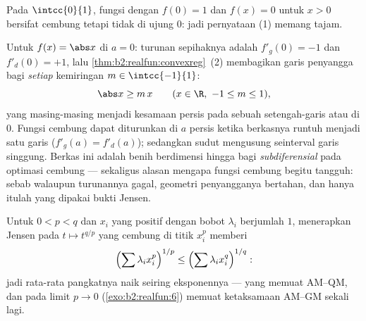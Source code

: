 \begin{example}
Pada $\intcc{0}{1}$, fungsi dengan $f(0) = 1$ dan $f(x) = 0$ untuk $x >
0$ bersifat cembung tetapi tidak  di ujung $0$: jadi pernyataan
(1) memang tajam.
\end{example}

\begin{example}\label{ex:b2:realfun:corner}
Untuk $f(x) = \abs x$ di $a = 0$: turunan sepihaknya adalah
$f'_g(0) = -1$ dan $f'_d(0) = +1$, lalu
\cref{thm:b2:realfun:convexreg}~(2) membagikan garis penyangga bagi
\emph{setiap} kemiringan $m \in \intcc{-1}{1}$:
\[
\abs x \geq m\,x \qquad (x \in \R,\ -1 \leq m \leq 1),
\]
yang masing-masing menjadi kesamaan persis pada sebuah setengah-garis
atau di $0$. Fungsi cembung dapat diturunkan di $a$ persis ketika
berkasnya runtuh menjadi satu garis ($f'_g(a) = f'_d(a)$); sedangkan
sudut mengusung seinterval garis singgung. Berkas ini adalah benih
berdimensi hingga bagi \emph{subdiferensial} pada optimasi cembung ---
sekaligus alasan mengapa fungsi cembung begitu tangguh: sebab walaupun
turunannya gagal, geometri penyangganya bertahan, dan hanya itulah yang
dipakai bukti Jensen.
\end{example}

\begin{example}\label{ex:b2:realfun:powermeans}
Untuk $0 < p < q$ dan $x_i$ yang positif dengan bobot $\lambda_i$
berjumlah $1$, menerapkan Jensen pada $t \mapsto t^{q/p}$ yang cembung
di titik $x_i^p$ memberi
\[
\Bigl(\sum \lambda_i x_i^{p}\Bigr)^{1/p}
\leq \Bigl(\sum \lambda_i x_i^{q}\Bigr)^{1/q} :
\]
jadi rata-rata pangkatnya naik seiring eksponennya --- yang memuat
AM--QM, dan pada limit $p \to 0$ (\cref{exo:b2:realfun:6}) memuat
ketaksamaan AM--GM sekali lagi.
\end{example}

